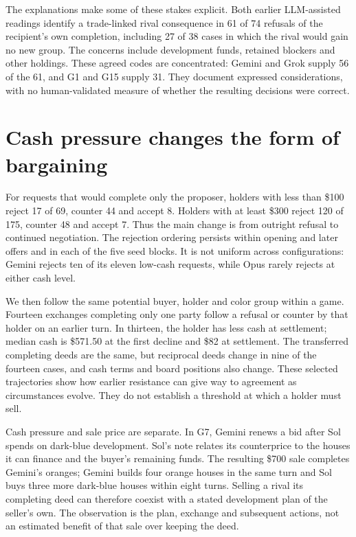 The explanations make some of these stakes explicit. Both earlier
LLM-assisted readings identify a trade-linked rival consequence in 61 of
74 refusals of the recipient's own completion, including 27 of 38 cases in
which the rival would gain no new group. The concerns include development
funds, retained blockers and other holdings. These agreed codes are
concentrated: Gemini and Grok supply 56 of the 61, and G1 and G15 supply 31.
They document expressed considerations, with no human-validated measure of
whether the resulting decisions were correct.

\section*{Cash pressure changes the form of bargaining}

For requests that would complete only the proposer, holders with less than
\$100 reject 17 of 69, counter 44 and accept 8. Holders with at least \$300
reject 120 of 175, counter 48 and accept 7. Thus the main change is from
outright refusal to continued negotiation. The rejection ordering persists
within opening and later offers and in each of the five seed blocks. It is
not uniform across configurations: Gemini rejects ten of its eleven low-cash
requests, while Opus rarely rejects at either cash level.

We then follow the same potential buyer, holder and color group within a
game. Fourteen exchanges completing only one party follow a refusal or
counter by that holder on an earlier turn. In thirteen, the holder has less
cash at settlement; median cash is \$571.50 at the first decline and \$82
at settlement. The transferred completing deeds are the same, but reciprocal
deeds change in nine of the fourteen cases, and cash terms and board positions
also change. These selected trajectories show how earlier resistance can
give way to agreement as circumstances evolve. They do not establish a
threshold at which a holder must sell.

Cash pressure and sale price are separate. In G7, Gemini renews a bid after
Sol spends on dark-blue development. Sol's note relates its counterprice to
the houses it can finance and the buyer's remaining funds. The resulting
\$700 sale completes Gemini's oranges; Gemini builds four orange houses
in the same turn and Sol buys three more dark-blue houses within eight turns.
Selling a rival its completing deed can therefore coexist with a stated
development plan of the seller's own. The observation is the plan, exchange
and subsequent actions, not an estimated benefit of that sale over keeping
the deed.

